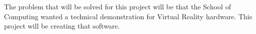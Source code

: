 The problem that will be solved for this project will be that the School of Computing wanted a technical demonstration for Virtual Reality hardware. This project will be creating that software.